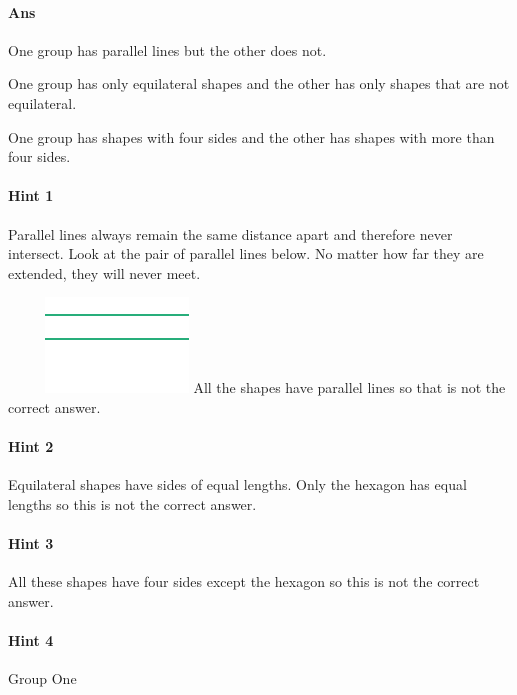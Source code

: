 \documentclass[twocolumn,10pt]{article}
\def\shrinkfactor{0.55}
\begin{document}
\paragraph{Ans} 

One group has parallel lines but the other does not.

One group has only equilateral shapes and the other has only shapes that are not equilateral.

One group has shapes with four sides and the other has shapes with more than four sides.


 

\paragraph{Hint 1}Parallel lines always remain the same distance apart and therefore never intersect.  Look at the pair of parallel lines below.  No matter how far they are extended, they will never meet.

$\phantom{xxxx}$
\includegraphics[scale=\shrinkfactor]{figures/7cf1fbfb7516a57d37ad80007a3886c81c33f393.png}  
All the shapes have parallel lines so that is not the correct answer.

\paragraph{Hint 2}Equilateral shapes have sides of equal lengths.  Only the hexagon has equal lengths so this is not the correct answer.

\paragraph{Hint 3}All these shapes have four sides except the hexagon so this is not the correct answer.

\paragraph{Hint 4}Group One
\end{document}
